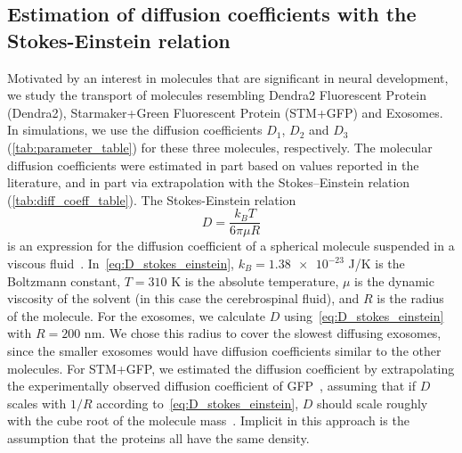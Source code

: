 \documentclass[fleqn]{wlscirep}
\begin{document}
\subsection*{Estimation of diffusion coefficients with the Stokes-Einstein relation}\label{subsec:diff_coeffs}
Motivated by an interest in molecules that are significant in neural development, we study the transport of molecules resembling Dendra2 Fluorescent Protein (Dendra2), Starmaker+Green Fluorescent Protein (STM+GFP) and Exosomes. In simulations, we use the diffusion coefficients $D_1$, $D_2$ and $D_3$ (\cref{tab:parameter_table}) for these three molecules, respectively. The molecular diffusion coefficients were estimated in part based on values reported in the literature, and in part via extrapolation with the Stokes--Einstein relation (\cref{tab:diff_coeff_table}). The Stokes-Einstein relation
\begin{equation}
    D = \frac{k_B T}{6\pi \mu R}
    \label{eq:D_stokes_einstein}
\end{equation}
is an expression for the diffusion coefficient of a spherical molecule suspended in a viscous fluid~\cite{Einstein1905UberTeilchen}. In~\eqref{eq:D_stokes_einstein}, $k_B = \num{1.38e-23}$ J/K is the Boltzmann constant, $T = 310$ K is the absolute temperature, $\mu$ is the dynamic viscosity of the solvent (in this case the cerebrospinal fluid), and $R$ is the radius of the molecule. For the exosomes, we calculate $D$ using~\eqref{eq:D_stokes_einstein} with $R=200$ nm. We chose this radius to cover the slowest diffusing exosomes, since the smaller exosomes would have diffusion coefficients similar to the other molecules. For STM+GFP, we estimated the diffusion coefficient by extrapolating the experimentally observed diffusion coefficient of GFP~\cite{Swaminathan1997PhotobleachingDiffusion, Potma2001ReducedCells}, assuming that if $D$ scales with $1/R$ according to~\eqref{eq:D_stokes_einstein}, $D$ should scale roughly with the cube root of the molecule mass~\cite{Goodhill1997DiffusionGuidance}. Implicit in this approach is the assumption that the proteins all have the same density.
\end{document}
